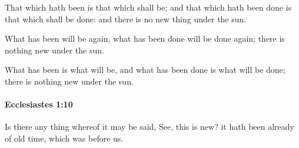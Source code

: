 			\begin{versebox}
					\item[BHS] 
					\item[LXX] 
					\item[ASV] That which hath been is that which shall be; and that which hath been done is that which shall be done: and there is no new thing under the sun.
					\item[NIV] What has been will be again, what has been done will be done again; there is nothing new under the sun.
					\item[NRSV] What has been is what will be, and what has been done is what will be done; there is nothing new under the sun.
			\end{versebox}

		\paragraph{Ecclesiastes 1:10} %
			\label{ECCLESIASTES-1-10}

			Is there any thing whereof it may be said, See, this is new? it hath been already of old time, which was before us.

